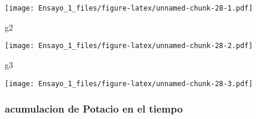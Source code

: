 \documentclass[
]{article}
\newenvironment{Shaded}{\begin{snugshade}}{\end{snugshade}}
\newcommand{\AttributeTok}[1]{\textcolor[rgb]{0.77,0.63,0.00}{#1}}
\newcommand{\FunctionTok}[1]{\textcolor[rgb]{0.00,0.00,0.00}{#1}}
\newcommand{\NormalTok}[1]{#1}
\newcommand{\OtherTok}[1]{\textcolor[rgb]{0.56,0.35,0.01}{#1}}
\newcommand{\SpecialCharTok}[1]{\textcolor[rgb]{0.00,0.00,0.00}{#1}}
\newcommand{\StringTok}[1]{\textcolor[rgb]{0.31,0.60,0.02}{#1}}
\begin{document}
\begin{Shaded}
\end{Shaded}

\texttt{[image: Ensayo\_1\_files/figure-latex/unnamed-chunk-28-1.pdf]}

\begin{Shaded}
\begin{Highlighting}[]
\NormalTok{g2}
\end{Highlighting}
\end{Shaded}

\texttt{[image: Ensayo\_1\_files/figure-latex/unnamed-chunk-28-2.pdf]}

\begin{Shaded}
\begin{Highlighting}[]
\NormalTok{g3}
\end{Highlighting}
\end{Shaded}

\texttt{[image: Ensayo\_1\_files/figure-latex/unnamed-chunk-28-3.pdf]}

\hypertarget{acumulacion-de-potacio-en-el-tiempo}{%
\subsubsection{acumulacion de Potacio en el
tiempo}\label{acumulacion-de-potacio-en-el-tiempo}}
\end{document}
